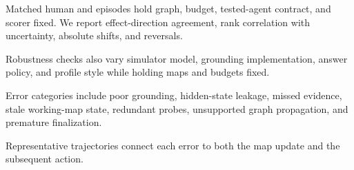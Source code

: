Matched human and \sagesim episodes hold graph, budget, tested-agent contract, and scorer fixed. We
report effect-direction agreement, rank correlation with uncertainty, absolute shifts, and reversals.

Robustness checks also vary simulator model, grounding implementation, answer policy, and profile style
while holding maps and budgets fixed.

Error categories include poor grounding, hidden-state leakage, missed evidence, stale working-map state,
redundant probes, unsupported graph propagation, and premature finalization.

Representative trajectories connect each error to both the map update and the subsequent action.

